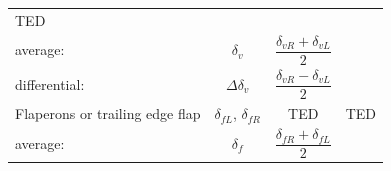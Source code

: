 \documentclass[
]{book}
\begin{document}
\begin{longtable}[]{@{}lccc@{}}
\begin{minipage}[t]{0.27\columnwidth}
TED\strut
\end{minipage}\tabularnewline
\begin{minipage}[t]{0.19\columnwidth}\raggedright
average:\strut
\end{minipage} & \begin{minipage}[t]{0.14\columnwidth}\centering
\(\delta_v\)\strut
\end{minipage} & \begin{minipage}[t]{0.29\columnwidth}\centering
\[\frac{\delta_{vR} + \delta_{vL}}{2}\]\strut
\end{minipage} & \begin{minipage}[t]{0.27\columnwidth}\centering
\strut
\end{minipage}\tabularnewline
\begin{minipage}[t]{0.19\columnwidth}\raggedright
differential:\strut
\end{minipage} & \begin{minipage}[t]{0.14\columnwidth}\centering
\(\Delta\delta_v\)\strut
\end{minipage} & \begin{minipage}[t]{0.29\columnwidth}\centering
\[\frac{\delta_{vR} - \delta_{vL}}{2}\]\strut
\end{minipage} & \begin{minipage}[t]{0.27\columnwidth}\centering
\strut
\end{minipage}\tabularnewline
\begin{minipage}[t]{0.19\columnwidth}\raggedright
Flaperons or trailing edge flap\strut
\end{minipage} & \begin{minipage}[t]{0.14\columnwidth}\centering
\(\delta_{fL}\),
\(\delta_{fR}\)\strut
\end{minipage} & \begin{minipage}[t]{0.29\columnwidth}\centering
TED\strut
\end{minipage} & \begin{minipage}[t]{0.27\columnwidth}\centering
TED\strut
\end{minipage}\tabularnewline
\begin{minipage}[t]{0.19\columnwidth}\raggedright
average:\strut
\end{minipage} & \begin{minipage}[t]{0.14\columnwidth}\centering
\(\delta_f\)\strut
\end{minipage} & \begin{minipage}[t]{0.29\columnwidth}\centering
\[\frac{\delta_{fR} + \delta_{fL}}{2}\]\strut

\end{minipage}
\end{longtable}
\end{document}
